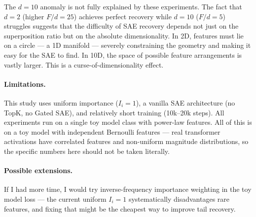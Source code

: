 \documentclass[10pt,twocolumn]{article}
\begin{document}
The $d{=}10$ anomaly is not fully explained by these experiments. The fact that $d{=}2$
(higher $F/d{=}25$) achieves perfect recovery while $d{=}10$ ($F/d{=}5$)
struggles suggests that the difficulty of SAE recovery depends not just on the
superposition ratio but on the absolute dimensionality. In 2D, features must
lie on a circle --- a 1D manifold --- severely constraining the geometry and
making it easy for the SAE to find. In 10D, the space of possible feature
arrangements is vastly larger. This is a curse-of-dimensionality effect.

\paragraph{Limitations.}
This study uses uniform importance ($I_i = 1$), a vanilla SAE architecture
(no TopK, no Gated SAE), and relatively short training (10k--20k steps).
All experiments run on a single toy model class with power-law features.
All of this is on a toy model with independent Bernoulli features --- real transformer activations have correlated features and non-uniform magnitude distributions, so the specific numbers here should not be taken literally.

\paragraph{Possible extensions.}
If I had more time, I would try inverse-frequency importance weighting in the toy model loss --- the current uniform $I_i = 1$ systematically disadvantages rare features, and fixing that might be the cheapest way to improve tail recovery.

\end{document}
